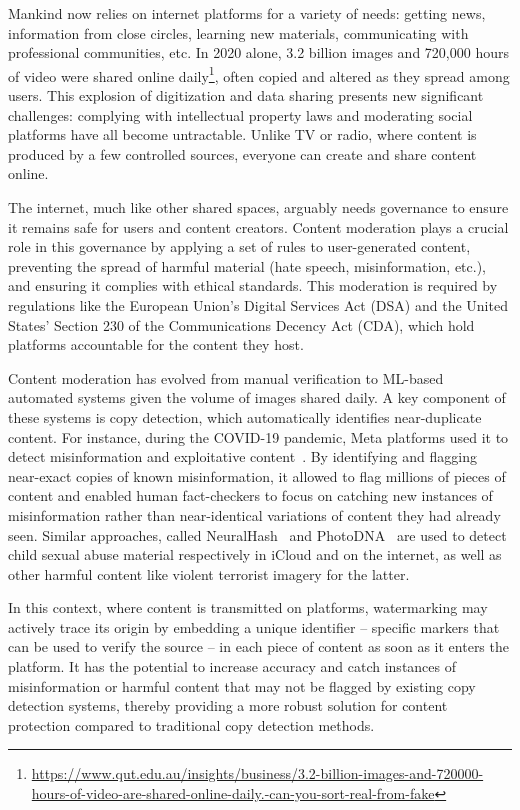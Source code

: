 Mankind now relies on internet platforms for a variety of needs: getting news, information from close circles, learning new materials, communicating with professional communities, etc.
In 2020 alone, 3.2 billion images and 720,000 hours of video were shared online daily\footnote{\scriptsize\url{https://www.qut.edu.au/insights/business/3.2-billion-images-and-720000-hours-of-video-are-shared-online-daily.-can-you-sort-real-from-fake}}, often copied and altered as they spread among users.
This explosion of digitization and data sharing presents new significant challenges: complying with intellectual property laws and moderating social platforms have all become untractable. 
Unlike TV or radio, where content is produced by a few controlled sources, everyone can create and share content online. 

The internet, much like other shared spaces, arguably needs governance to ensure it remains safe for users and content creators. 
Content moderation plays a crucial role in this governance by applying a set of rules to user-generated content, preventing the spread of harmful material (hate speech, misinformation, etc.), and ensuring it complies with ethical standards.
This moderation is required by regulations like the European Union's Digital Services Act (DSA) and the United States' Section 230 of the Communications Decency Act (CDA), which hold platforms accountable for the content they host.

Content moderation has evolved from manual verification to ML-based automated systems given the volume of images shared daily.
A key component of these systems is copy detection, which automatically identifies near-duplicate content. 
For instance, during the COVID-19 pandemic, Meta platforms used it to detect misinformation and exploitative content~\citep{sumbaly2020using, pizzi2022self}. 
By identifying and flagging near-exact copies of known misinformation, it allowed to flag millions of pieces of content and enabled human fact-checkers to focus on catching new instances of misinformation rather than near-identical variations of content they had already seen.
Similar approaches, called  NeuralHash~\citep{apple2021csamdetection} and PhotoDNA~\citep{photodna} are used to detect child sexual abuse material respectively in iCloud and on the internet, as well as other harmful content like violent terrorist imagery for the latter.

In this context, where content is transmitted on platforms, watermarking may actively trace its origin by embedding a unique identifier -- specific markers that can be used to verify the source -- in each piece of content as soon as it enters the platform.
It has the potential to increase accuracy and catch instances of misinformation or harmful content that may not be flagged by existing copy detection systems, thereby providing a more robust solution for content protection compared to traditional copy detection methods.





